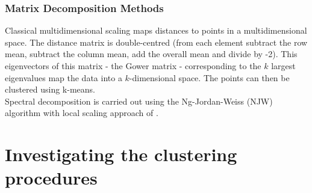 \documentclass[10pt]{article}
\begin{document}

\subsubsection{Matrix Decomposition Methods}
Classical multidimensional scaling maps distances to points in a multidimensional space. The distance matrix is double-centred (from each element subtract the row mean, subtract the column mean, add the overall mean and divide by -2). This eigenvectors of this matrix - the Gower matrix - corresponding to the $k$ largest eigenvalues map the data into a $k$-dimensional space. The points can then be clustered using k-means.\\
Spectral decomposition is carried out using the Ng-Jordan-Weiss (NJW) algorithm \citep{Ng:2002tj} with local scaling approach of \citet{Perona:2004tk}.


\section{Investigating the clustering procedures}


\newpage


\end{document}
